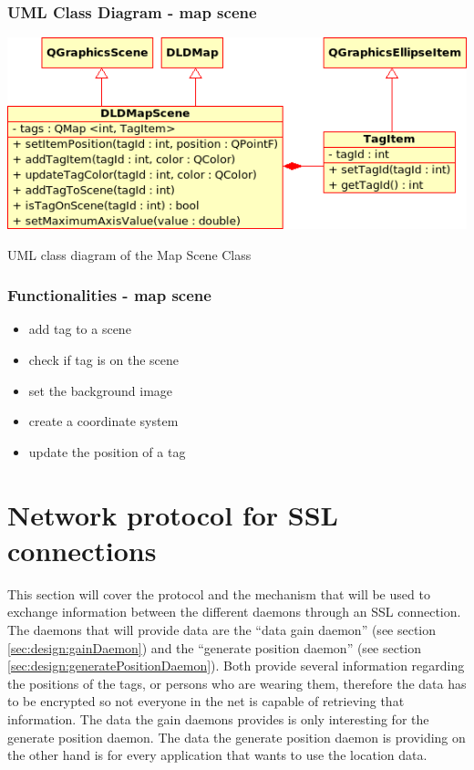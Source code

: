     \subsubsection{UML Class Diagram - map scene}
     \begin{staticFigure}
      \centering
      \includegraphics[scale=0.6]{UMLDiagrams/dldMapScene.png}
      \caption{UML class diagram of the Map Scene Class}
      \label{fg:projectModularization:mapScene}
     \end{staticFigure}

    \subsubsection{Functionalities - map scene}
    \begin{itemize}
     \item add tag to a scene
     \item check if tag is on the scene
     \item set the background image
     \item create a coordinate system
     \item update the position of a tag
    \end{itemize}

 \section{Network protocol for SSL connections}
  This section will cover the protocol and the mechanism that will be used to exchange information between the different daemons through an SSL connection. The daemons that will provide data are the ``data gain daemon'' (see section \ref{sec:design:gainDaemon}) and the ``generate position daemon'' (see section  \ref{sec:design:generatePositionDaemon}). Both provide several information regarding the positions of the tags, or persons who are wearing them, therefore the data has to be encrypted so not everyone in the net is capable of retrieving that information. The data the gain daemons provides is only interesting for the generate position daemon. The data the generate position daemon is providing on the other hand is for every application that wants to use the location data.

